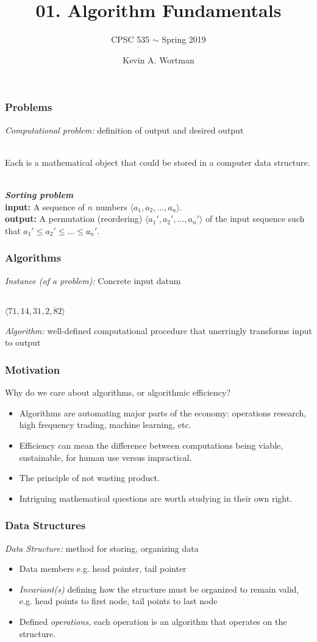 \documentclass{beamer}
\title{01. Algorithm Fundamentals}
\subtitle{CPSC 535 $\sim$ Spring 2019}
\author{Kevin A. Wortman}
\institute{California State University, Fullerton}
\newcommand{\stanza}{ \\~\ }
\begin{document}
\begin{frame}
  \titlepage
\end{frame}

\begin{frame} \frametitle{Problems}

  \emph{Computational problem:} definition of output and desired output \stanza

  Each is a mathematical object that could be stored in a computer data
  structure.  \stanza

  \emph{\textbf{Sorting problem}} \\
  \textbf{input:} A sequence of $n$ numbers
    $\langle a_1, a_2, \ldots, a_n \rangle.$ \\
  \textbf{output:} A permutation (reordering)
    $\langle a_1', a_2', \ldots, a_n' \rangle$ of the input sequence such
    that $a_1' \le a_2' \le \ldots \le a_n'.$
\end{frame}

\begin{frame} \frametitle{Algorithms}
  \emph{Instance (of a problem):} Concrete input datum \stanza

  \begin{example}
    $\langle 71, 14, 31, 2, 82 \rangle$
  \end{example}

  \emph{Algorithm:} well-defined computational procedure that unerringly
    transforms input to output
\end{frame}

\begin{frame} \frametitle{Motivation}
  Why do we care about algorithms, or algorithmic efficiency?
  \begin{itemize}
    \item Algorithms are automating major parts of the economy: operations
      research, high frequency trading, machine learning, etc.
    \item Efficiency can mean the difference between computations being
      viable, sustainable, for human use versus impractical.
    \item The principle of not wasting product.
    \item Intriguing mathematical questions are worth studying in their own
      right.
  \end{itemize}
\end{frame}

\begin{frame} \frametitle{Data Structures}
  \emph{Data Structure:} method for storing, organizing data
  \begin{itemize}
    \item Data members e.g. head pointer, tail pointer
    \item \emph{Invariant(s)} defining how the structure must be organized
      to remain valid, e.g. head points to first node, tail points to last node
    \item Defined \emph{operations,} each operation is an algorithm that
      operates on the structure.
    \end{itemize}
\end{frame}
\end{document}
